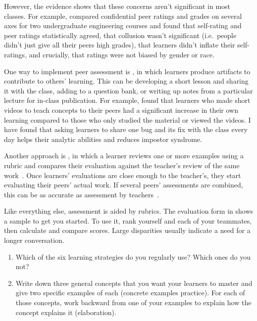 However,
the evidence shows that these concerns aren't significant in most classes.
For example,
\cite{Kauf2000} compared confidential peer ratings and grades on several axes
for two undergraduate engineering courses
and found that self-rating and peer ratings statistically agreed,
that collusion wasn't significant (i.e.\ people didn't just give all their peers high grades),
that learners didn't inflate their self-ratings,
and crucially,
that ratings were not biased by gender or race.

One way to implement peer assessment is ,
in which learners produce artifacts to contribute to others' learning.
This can be developing a short lesson and sharing it with the class,
adding to a question bank,
or writing up notes from a particular lecture for in-class publication.
For example,
\cite{Fran2018} found that learners who made short videos to teach concepts to their peers
had a significant increase in their own learning
compared to those who only studied the material or viewed the videos.
I have found that asking learners to share one bug and its fix with the class every day
helps their analytic abilities and reduces impostor syndrome.

Another approach is ,
in which a learner reviews one or more examples using a rubric
and compares their evaluation against the teacher's review of the same work~\cite{Kulk2013}.
Once learners' evaluations are close enough to the teacher's,
they start evaluating their peers' actual work.
If several peers' assessments are combined,
this can be as accurate as assessment by teachers~\cite{Pare2008}.

Like everything else,
assessment is aided by rubrics.
The evaluation form in  shows a sample to get you started.
To use it,
rank yourself and each of your teammates,
then calculate and compare scores.
Large disparities usually indicate a need for a longer conversation.



\begin{enumerate}

\item
  Which of the six learning strategies do you regularly use?
  Which ones do you not?

\item
  Write down three general concepts that you want your learners to   master
  and give two specific examples of each
  (concrete examples practice).
  For each of those concepts,
  work backward from one of your examples to explain how the concept explains it
  (elaboration).

\end{enumerate}

